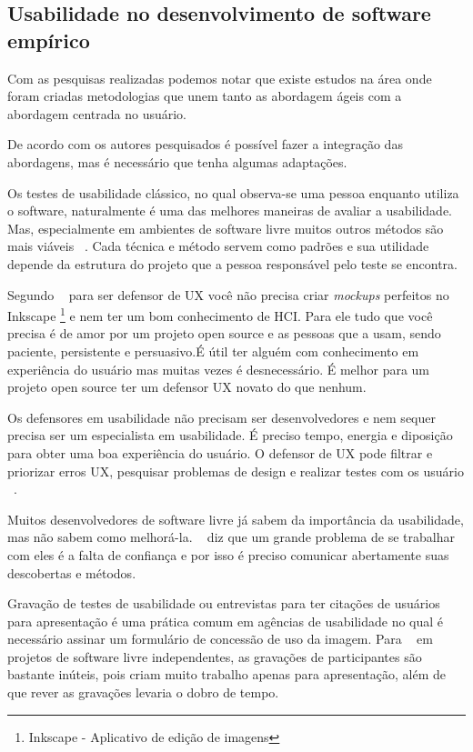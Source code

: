 \subsection{Usabilidade no desenvolvimento de software empírico}

Com as pesquisas realizadas podemos notar que existe estudos na área onde foram criadas metodologias que unem tanto as abordagem ágeis com a abordagem centrada no usuário.

De acordo com os autores pesquisados é possível fazer a integração das abordagens, mas é necessário que tenha algumas adaptações.

Os testes de usabilidade clássico, no qual observa-se uma pessoa enquanto utiliza o software, naturalmente é uma das melhores maneiras de avaliar a usabilidade. Mas, especialmente em ambientes de software livre muitos outros métodos são mais viáveis ~\cite{borchardt2011}. Cada técnica e método servem como padrões e sua utilidade depende da estrutura do projeto que a pessoa responsável pelo teste se encontra. 

Segundo ~ para ser defensor de UX você não precisa criar  \textit{mockups} perfeitos no Inkscape \footnote{Inkscape - Aplicativo de edição de imagens} e nem ter um bom conhecimento de HCI. Para ele tudo que você precisa é de amor por um projeto open source e as pessoas que a usam, sendo paciente, persistente e persuasivo.É útil ter alguém com conhecimento em experiência do usuário mas muitas vezes é desnecessário. É melhor para um projeto open source ter um defensor UX novato do que nenhum.

	Os defensores em usabilidade não precisam ser desenvolvedores e nem sequer precisa ser um especialista em usabilidade. É preciso tempo, energia e diposição para obter uma boa experiência do usuário. O defensor de UX pode filtrar e priorizar erros UX, pesquisar problemas de design e realizar testes com os usuário ~\cite{day2010}.

	Muitos desenvolvedores de software livre já sabem da importância da usabilidade, mas não sabem como melhorá-la. ~ diz que um grande problema de se trabalhar com eles é a falta de confiança e por isso é preciso comunicar abertamente suas descobertas e métodos. 

	Gravação de testes de usabilidade ou entrevistas para ter citações de usuários para apresentação é uma prática comum em agências de usabilidade no qual é necessário assinar um formulário de concessão de uso da imagem. Para ~ em projetos de software livre independentes, as gravações de participantes são bastante inúteis, pois criam muito trabalho apenas para apresentação, além de que rever as gravações levaria o dobro de tempo.

